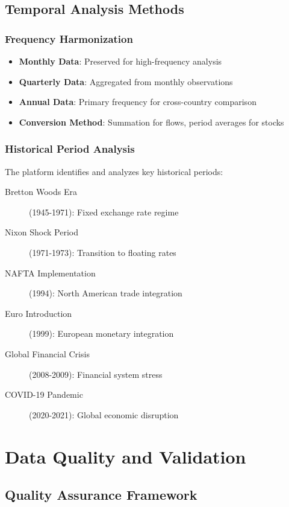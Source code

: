 \documentclass[11pt,a4paper]{article}
\begin{document}
\subsection{Temporal Analysis Methods}

\subsubsection{Frequency Harmonization}
\begin{itemize}
    \item \textbf{Monthly Data}: Preserved for high-frequency analysis
    \item \textbf{Quarterly Data}: Aggregated from monthly observations
    \item \textbf{Annual Data}: Primary frequency for cross-country comparison
    \item \textbf{Conversion Method}: Summation for flows, period averages for stocks
\end{itemize}

\subsubsection{Historical Period Analysis}
The platform identifies and analyzes key historical periods:
\begin{description}
    \item[Bretton Woods Era] (1945-1971): Fixed exchange rate regime
    \item[Nixon Shock Period] (1971-1973): Transition to floating rates
    \item[NAFTA Implementation] (1994): North American trade integration
    \item[Euro Introduction] (1999): European monetary integration
    \item[Global Financial Crisis] (2008-2009): Financial system stress
    \item[COVID-19 Pandemic] (2020-2021): Global economic disruption
\end{description}

\section{Data Quality and Validation}

\subsection{Quality Assurance Framework}
\end{document}
